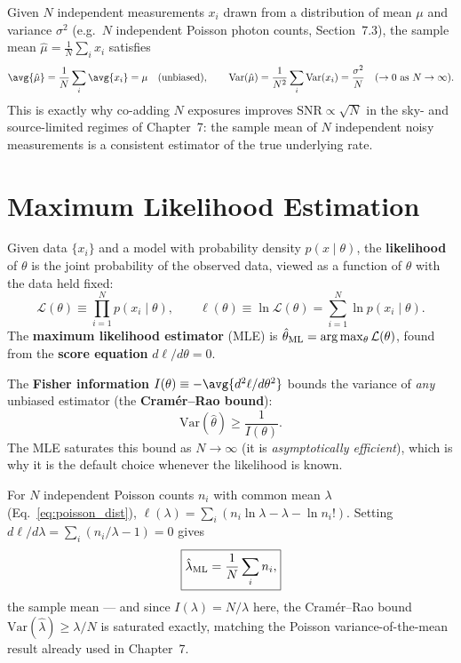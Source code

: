 \begin{example}
	Given $N$ independent measurements $x_i$ drawn from a distribution of mean $\mu$ and variance $\sigma^2$ (e.g.\ $N$ independent Poisson photon counts, Section~7.3), the sample mean $\hat\mu=\frac1N\sum_i x_i$ satisfies
	\[
	\avg{\hat\mu} = \frac1N\sum_i\avg{x_i} = \mu \quad(\text{unbiased}), \qquad
	\mathrm{Var}(\hat\mu) = \frac{1}{N^2}\sum_i\mathrm{Var}(x_i) = \frac{\sigma^2}{N} \quad(\to0 \text{ as } N\to\infty).
	\]
	This is exactly why co-adding $N$ exposures improves $\mathrm{SNR}\propto\sqrt N$ in the sky- and source-limited regimes of Chapter~7: the sample mean of $N$ independent noisy measurements is a consistent estimator of the true underlying rate.
\end{example}

\section{Maximum Likelihood Estimation}

\begin{definition}
	Given data $\{x_i\}$ and a model with probability density $p(x\mid\theta)$, the \textbf{likelihood} of $\theta$ is the joint probability of the observed data, viewed as a function of $\theta$ with the data held fixed:
	\[
	\mathcal L(\theta) \equiv \prod_{i=1}^N p(x_i\mid\theta), \qquad \ell(\theta)\equiv\ln\mathcal L(\theta)=\sum_{i=1}^N\ln p(x_i\mid\theta).
	\]
	The \textbf{maximum likelihood estimator} (MLE) is $\hat\theta_{\rm ML}=\arg\max_\theta\mathcal L(\theta)$, found from the \textbf{score equation} $d\ell/d\theta=0$.
\end{definition}

\begin{keyresult}
	The \textbf{Fisher information} $I(\theta)\equiv-\avg{d^2\ell/d\theta^2}$ bounds the variance of \emph{any} unbiased estimator (the \textbf{Cramér--Rao bound}):
	\begin{equation}
		\mathrm{Var}(\hat\theta) \ge \frac{1}{I(\theta)}.
		\label{eq:cramer_rao}
	\end{equation}
	The MLE saturates this bound as $N\to\infty$ (it is \emph{asymptotically efficient}), which is why it is the default choice whenever the likelihood is known.
\end{keyresult}

\begin{example}
	For $N$ independent Poisson counts $n_i$ with common mean $\lambda$ (Eq.~\eqref{eq:poisson_dist}), $\ell(\lambda)=\sum_i(n_i\ln\lambda-\lambda-\ln n_i!)$. Setting $d\ell/d\lambda=\sum_i(n_i/\lambda-1)=0$ gives
	\[
	\boxed{\hat\lambda_{\rm ML}=\frac1N\sum_i n_i,}
	\]
	the sample mean --- and since $I(\lambda)=N/\lambda$ here, the Cramér--Rao bound $\mathrm{Var}(\hat\lambda)\ge\lambda/N$ is saturated exactly, matching the Poisson variance-of-the-mean result already used in Chapter~7.
\end{example}

